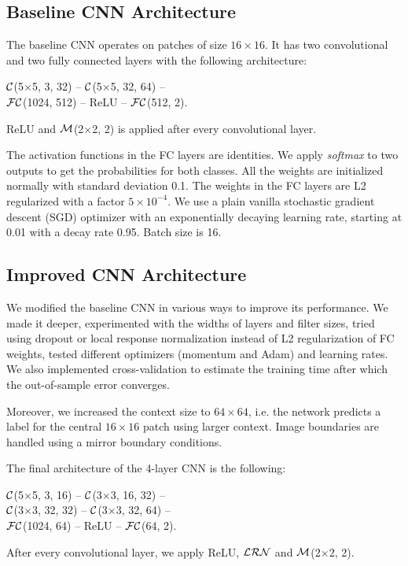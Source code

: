 \documentclass[10pt,conference,compsocconf]{IEEEtran}
\newcommand{\conv}[3]{$ \cal{C} $(#1$ \times  $#1, #2, #3)}
\newcommand{\maxpool}[2]{$ \cal{M} $(#1$ \times $#1, #2)}
\newcommand{\lrn}{$ \cal{LRN}~$}
\newcommand{\fc}[2]{$ \cal{FC} $(#1, #2)}
\begin{document}
\subsection{Baseline CNN Architecture}
\label{subsec:baselineCNN}
The baseline CNN operates on patches of size $16 \times 16$. It has two convolutional and two fully connected layers with the following architecture:
\begin{center}
	\conv{5}{3}{32} -- \conv{5}{32}{64} -- \\ 
	\fc{1024}{512} -- ReLU -- \fc{512}{2}.
\end{center}
ReLU and \maxpool{2}{2} is applied after every convolutional layer.

The activation functions in the FC layers are identities. We apply \textit{softmax} to two outputs to get the probabilities for both classes. All the weights are initialized normally with standard deviation 0.1. The weights in the FC layers are L2 regularized with a factor $ 5 \times 10^{-4} $. We use a plain vanilla stochastic gradient descent (SGD) optimizer with an exponentially decaying learning rate, starting at 0.01 with a decay rate 0.95. Batch size is 16. 

\subsection{Improved CNN Architecture}
\label{subsec:CNN}
We modified the baseline CNN in various ways to improve its performance. We made it deeper, experimented with the widths of layers and filter sizes, tried using dropout or local response normalization instead of L2 regularization of FC weights, tested different optimizers (momentum and Adam) and learning rates. We also implemented cross-validation to estimate the training time after which the out-of-sample error converges.

Moreover, we increased the context size to $ 64\times64 $, i.e. the network predicts a label for the central $ 16\times16 $ patch using larger context. Image boundaries are handled using a mirror boundary conditions.

The final architecture of the 4-layer CNN is the following:
\begin{center}
	\conv{5}{3}{16} -- \conv{3}{16}{32} -- \\ 
	\conv{3}{32}{32} -- \conv{3}{32}{64} -- \\
	\fc{1024}{64} -- ReLU -- \fc{64}{2}.
\end{center}
After every convolutional layer, we apply ReLU, \lrn and \maxpool{2}{2}.
\end{document}
